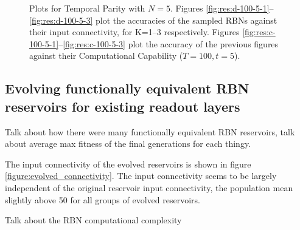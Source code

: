 \begin{figure*}[!t]
  \centering
  \resizebox{\textwidth}{!}{
    \subfloat[K=1]{
      
      \label{fig:res:d-100-5-1}
    }
    \subfloat[K=2]{
      
      \label{fig:res:d-100-5-2}
    }
    \subfloat[K=3]{
      
      \label{fig:res:d-100-5-3}
    }
  }

  \caption{
    Plots for Temporal Parity with $N=5$.
    Figures \ref{fig:res:d-100-5-1}–\ref{fig:res:d-100-5-3} plot the accuracies of the sampled RBNs against their input connectivity,
    for K=1–3 respectively.
    Figures \ref{fig:res:c-100-5-1}–\ref{fig:res:c-100-5-3} plot the accuracy of the previous figures against their Computational Capability ($T=100, t=5$).
  }
  \label{figure:results:temporal-parity-5}
\end{figure*}

\subsection{Evolving functionally equivalent RBN reservoirs for existing readout layers}

Talk about how there were many functionally equivalent RBN reservoirs,
talk about average max fitness of the final generations for each thingy.


The input connectivity of the evolved reservoirs is shown in figure \ref{figure:evolved_connectivity}.
The input connectivity seems to be largely independent of the original reservoir input connectivity,
the population mean slightly above 50 for all groups of evolved reservoirs.

Talk about the RBN computational complexity

